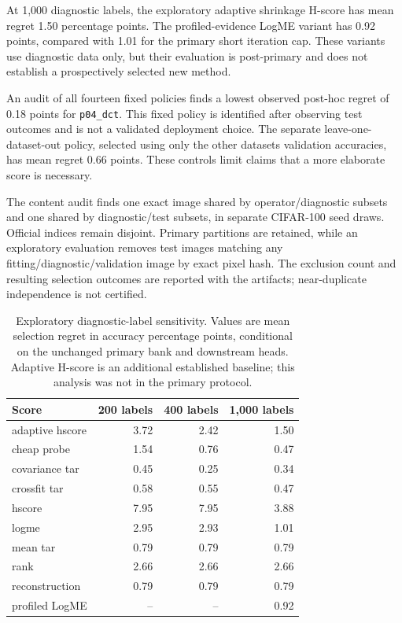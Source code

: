 At 1,000 diagnostic labels, the exploratory adaptive shrinkage H-score has mean regret 1.50 percentage points. The profiled-evidence LogME variant has 0.92 points, compared with 1.01 for the primary short iteration cap. These variants use diagnostic data only, but their evaluation is post-primary and does not establish a prospectively selected new method.

An audit of all fourteen fixed policies finds a lowest observed post-hoc regret of 0.18 points for \texttt{p04\_dct}. This fixed policy is identified after observing test outcomes and is not a validated deployment choice. The separate leave-one-dataset-out policy, selected using only the other dataset\textquotesingle s validation accuracies, has mean regret 0.66 points. These controls limit claims that a more elaborate score is necessary.

The content audit finds one exact image shared by operator/diagnostic subsets and one shared by diagnostic/test subsets, in separate CIFAR-100 seed draws. Official indices remain disjoint. Primary partitions are retained, while an exploratory evaluation removes test images matching any fitting/diagnostic/validation image by exact pixel hash. The exclusion count and resulting selection outcomes are reported with the artifacts; near-duplicate independence is not certified.
\begin{table}[t]
\centering\small
\caption{Exploratory diagnostic-label sensitivity. Values are mean selection regret in accuracy percentage points, conditional on the unchanged primary bank and downstream heads. Adaptive H-score is an additional established baseline; this analysis was not in the primary protocol.}\label{tab:labels}
\begin{tabular}{lrrr}\toprule Score & 200 labels & 400 labels & 1,000 labels\\\midrule
adaptive hscore & 3.72 & 2.42 & 1.50\\
cheap probe & 1.54 & 0.76 & 0.47\\
covariance tar & 0.45 & 0.25 & 0.34\\
crossfit tar & 0.58 & 0.55 & 0.47\\
hscore & 7.95 & 7.95 & 3.88\\
logme & 2.95 & 2.93 & 1.01\\
mean tar & 0.79 & 0.79 & 0.79\\
rank & 2.66 & 2.66 & 2.66\\
reconstruction & 0.79 & 0.79 & 0.79\\
profiled LogME & -- & -- & 0.92\\
\bottomrule\end{tabular}\end{table}
